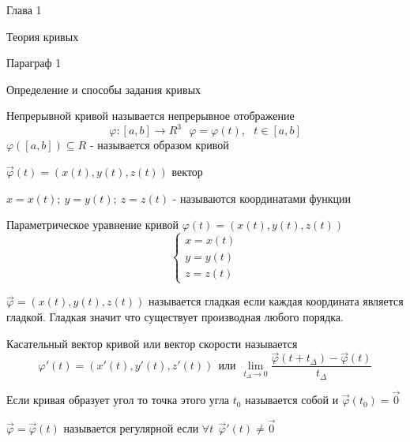 \begin{title}
  Глава 1
\end{title}

\begin{title}
  Теория кривых
\end{title}

\begin{title}
  Параграф 1
\end{title}

\begin{title}[\Large]
  Определение и способы задания кривых
\end{title}

\begin{define}[кривой]
  Непрерывной кривой называется непрерывное отображение
  $$
  \varphi: [a,b] \to R^3 ~~~ \varphi = \varphi (t), ~~~ t \in [a,b]
  $$
  $\varphi ([a,b]) \subseteq R$ - называется образом кривой

  $\vec \varphi (t) = ( x(t), y(t), z(t) )$ вектор

  $x = x(t); ~ y = y(t); ~ z = z(t)$ - называются координатами функции

  Параметрическое уравнение кривой $\varphi(t) = ( x(t), y(t), z(t) )$
  $$
  \left\{
  \begin{array}{c}
    x = x(t) \\
    y = y(t) \\
    z = z(t)
  \end{array}
  \right.
  $$
\end{define}

\begin{define}
  $\vec \varphi = ( x(t), y(t), z(t) )$ называется гладкая если каждая координата
  является гладкой. Гладкая значит что существует производная любого порядка.
\end{define}

\begin{define}
  Касательный вектор кривой или вектор скорости называется
  $$
  \varphi' (t) = ( x'(t), y'(t), z'(t) ) ~~ \text{или} ~~
  \lim_{ t_{\Delta} \to 0 }
  \frac{ \vec \varphi (t + t_{\Delta}) - \vec \varphi (t) }{t_{\Delta}}
  $$

  Если кривая образует угол то точка этого угла $t_0$ называется собой и
  $\vec \varphi (t_0) = \vec 0$
\end{define}

\begin{define}
  $\vec \varphi = \vec \varphi (t)$ называется регулярной если
  $\forall t ~~ \vec \varphi' (t) \not = \vec 0$
\end{define}

